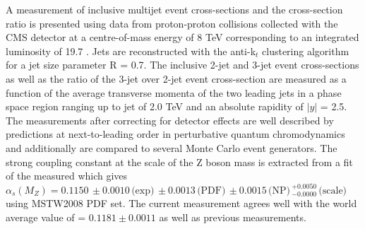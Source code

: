 A measurement of inclusive multijet event cross-sections and the cross-section ratio is presented using data from proton-proton collisions collected with the CMS detector at a centre-of-mass energy of 8 TeV corresponding to an integrated luminosity of 19.7 \fbinv. Jets are reconstructed with the anti-k$_t$ clustering algorithm for a jet size parameter R = 0.7. The inclusive 2-jet and 3-jet event cross-sections as well as the ratio of the 3-jet over 2-jet event cross-section \ratio are measured as a function of the average transverse momenta \pt of the two leading jets in a phase space region ranging up to jet \pt of 2.0 TeV and an absolute rapidity of $|y|$ = 2.5. The measurements after correcting for detector effects are well described by predictions at next-to-leading order in perturbative quantum chromodynamics and additionally are compared to several Monte Carlo event generators. The strong coupling constant at the scale of the Z boson mass is extracted from a fit of the measured \ratio which gives $\alpha_s(M_Z) = 0.1150\,\pm0.0010\,\textrm{(exp)}\,\pm0.0013\,\textrm{(PDF)}\, \pm0.0015\,\textrm{(NP)}\,^{+0.0050}_{-0.0000}\,\textrm{(scale)}$ using MSTW2008 PDF set. The current measurement agrees well with the world average value of \alpsmz = $0.1181 \pm 0.0011$ as well as previous measurements.
